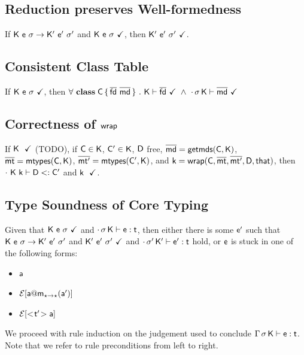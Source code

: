 \documentclass[acmlarge, anonymous, authordraft]{acmart}
\begin{document}
\subsection{Reduction preserves Well-formedness}

If $\Reduce \K\e\s \Kp\ep\sp$ and $\WFp\K{\e~\s}$, then $\WFp\Kp{\ep~\sp}$. 

\subsection{Consistent Class Table}

If $\WFp\K{\e~\s}$, then $\forall~\Class\C{\b{\fd}}{\b\md}~.~\WFtype\K{\b\fd}~\wedge~\WF\cdot\s\K{\b\md}$

\subsection{Correctness of $\xt{wrap}$}

If $\WFp \K$ (TODO), if $\C \in \K$, $\Cp \in \K$, $\D$ free, $\b\md = \getmds\C\K$, $\bmt = \classoff\C\K$, $\bmtp = \classoff\Cp\K$, and $\k = \wrap\C\bmt\bmtp\D\that$, then $\StrSub\cdot{\K~\k}\D\Cp$ and $\WFp \k$.

\subsection{Type Soundness of Core \kafka Typing}

Given that $\WFp\K{\e~\s}$ and $\EnvType\cdot\s\K\e\t$, then either there is some $\ep$ 
such that $\Reduce \K\e\s \Kp\ep\sp$ and $\WFp\Kp{\ep~\sp}$ and $\EnvType\cdot\sp\Kp\ep\t$ hold, 
or $\e$ is stuck in one of the following forms:
\begin{itemize} 
\item $\a$
\item $\EE[\DynCall\a\m{\ap}]$
\item $\EE[\SubCast\tp\a]$
\end{itemize}

We proceed with rule induction on the judgement used to conclude $\EnvType\Env\s\K\e\t$. 
Note that we refer to rule preconditions from left to right.
\end{document}
